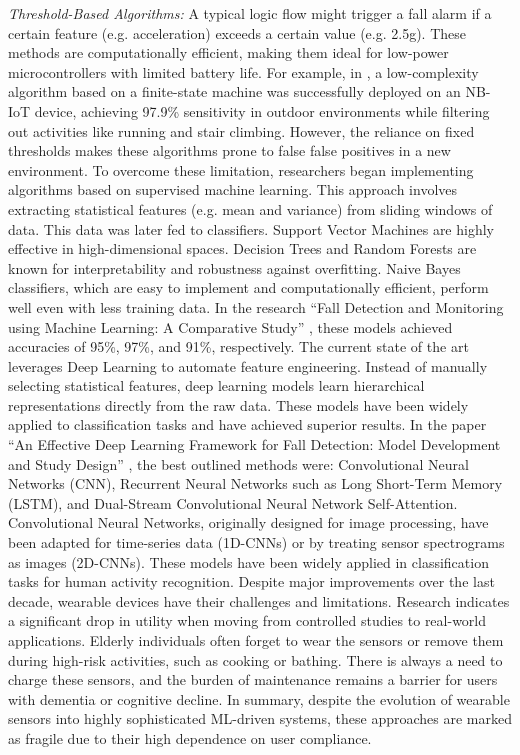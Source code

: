 \documentclass[11pt, a4paper, twoside]{article}
\begin{document}
\newline
\newline
\textit{Threshold-Based Algorithms:} A typical logic flow might trigger a fall alarm if a certain feature (e.g. acceleration) exceeds a certain value (e.g. 2.5g). These methods are computationally efficient, making them ideal for low-power microcontrollers with limited battery life. For example, in \cite{tseng2025wearable}, a low-complexity algorithm based on a finite-state machine was successfully deployed on an NB-IoT device, achieving 97.9\% sensitivity in outdoor environments while filtering out activities like running and stair climbing. However, the reliance on fixed thresholds makes these algorithms prone to false false positives in a new environment. To overcome these limitation, researchers began implementing algorithms based on supervised machine learning. This approach involves extracting statistical features (e.g. mean and variance) from sliding windows of data. This data was later fed to classifiers. Support Vector Machines are highly effective in high-dimensional spaces. Decision Trees and Random Forests are known for interpretability and robustness against overfitting. Naive Bayes classifiers, which are easy to implement and computationally efficient, perform well even with less training data. In the research ``Fall Detection and Monitoring using Machine Learning: A Comparative Study'' \cite{edeib2023comparative}, these models achieved accuracies of 95\%, 97\%, and 91\%, respectively. The current state of the art leverages Deep Learning to automate feature engineering. Instead of manually selecting statistical features, deep learning models learn hierarchical representations directly from the raw data. These models have been widely applied to classification tasks and have achieved superior results. In the paper ``An Effective Deep Learning Framework for Fall Detection: Model Development and Study Design'' \cite{zhang2024effective}, the best outlined methods were: Convolutional Neural Networks (CNN), Recurrent Neural Networks such as Long Short-Term Memory (LSTM), and Dual-Stream Convolutional Neural Network Self-Attention. Convolutional Neural Networks, originally designed for image processing, have been adapted for time-series data (1D-CNNs) or by treating sensor spectrograms as images (2D-CNNs). These models have been widely applied in classification tasks for human activity recognition.
\newline
\newline
Despite major improvements over the last decade, wearable devices have their challenges and limitations. Research indicates a significant drop in utility when moving from controlled studies to real-world applications. Elderly individuals often forget to wear the sensors or remove them during high-risk activities, such as cooking or bathing. There is always a need to charge these sensors, and the burden of maintenance remains a barrier for users with dementia or cognitive decline. In summary, despite the evolution of wearable sensors into highly sophisticated ML-driven systems, these approaches are marked as fragile due to their high dependence on user compliance.
\end{document}

